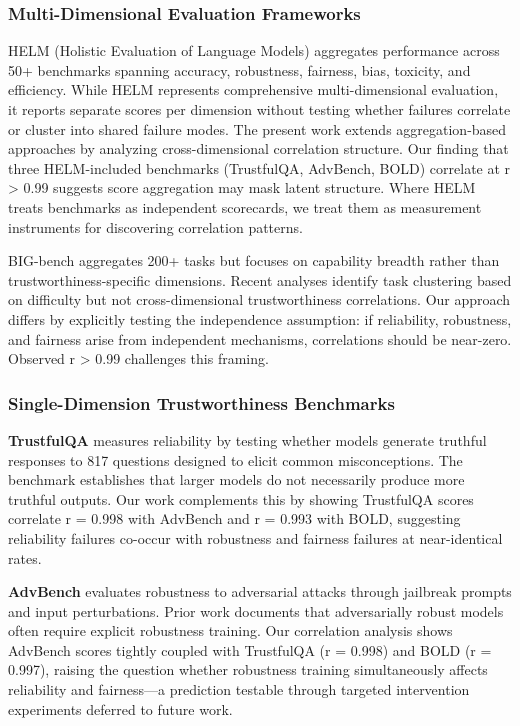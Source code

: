 
\subsubsection{Multi-Dimensional Evaluation Frameworks}

HELM (Holistic Evaluation of Language Models) aggregates performance across 50+ benchmarks spanning accuracy, robustness, fairness, bias, toxicity, and efficiency. While HELM represents comprehensive multi-dimensional evaluation, it reports separate scores per dimension without testing whether failures correlate or cluster into shared failure modes. The present work extends aggregation-based approaches by analyzing cross-dimensional correlation structure. Our finding that three HELM-included benchmarks (TrustfulQA, AdvBench, BOLD) correlate at r > 0.99 suggests score aggregation may mask latent structure. Where HELM treats benchmarks as independent scorecards, we treat them as measurement instruments for discovering correlation patterns.

BIG-bench aggregates 200+ tasks but focuses on capability breadth rather than trustworthiness-specific dimensions. Recent analyses identify task clustering based on difficulty but not cross-dimensional trustworthiness correlations. Our approach differs by explicitly testing the independence assumption: if reliability, robustness, and fairness arise from independent mechanisms, correlations should be near-zero. Observed r > 0.99 challenges this framing.

\subsubsection{Single-Dimension Trustworthiness Benchmarks}

\textbf{TrustfulQA} measures reliability by testing whether models generate truthful responses to 817 questions designed to elicit common misconceptions. The benchmark establishes that larger models do not necessarily produce more truthful outputs. Our work complements this by showing TrustfulQA scores correlate r = 0.998 with AdvBench and r = 0.993 with BOLD, suggesting reliability failures co-occur with robustness and fairness failures at near-identical rates.

\textbf{AdvBench} evaluates robustness to adversarial attacks through jailbreak prompts and input perturbations. Prior work documents that adversarially robust models often require explicit robustness training. Our correlation analysis shows AdvBench scores tightly coupled with TrustfulQA (r = 0.998) and BOLD (r = 0.997), raising the question whether robustness training simultaneously affects reliability and fairness---a prediction testable through targeted intervention experiments deferred to future work.

